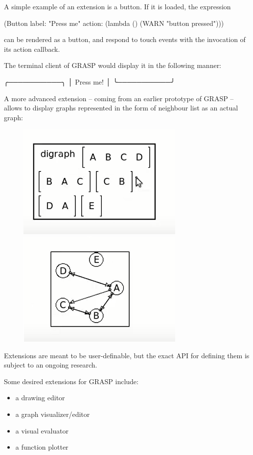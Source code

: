 \documentclass[sigconf]{acmart}
\newenvironment{Snippet}{\Verbatim[samepage=true]}{\endVerbatim}
\begin{document}
A simple example of an extension is a button.
If it is loaded, the expression

\begin{Snippet}
(Button label: "Press me" 
	action: (lambda () (WARN "button pressed")))
\end{Snippet}

can be rendered as a button, and respond
to touch events with the invocation of its
action callback.

The terminal client of GRASP would display
it in the following manner:

\begin{Snippet}
╭───────────╮
│ Press me! │
╰───────────╯
\end{Snippet}

A more advanced extension -- coming from an earlier
prototype of GRASP -- allows to display graphs represented
in the form of neighbour list as an actual graph:

\begin{figure}[H]
  \centering%
  \includegraphics[width=.45\linewidth,frame]{digraph-1}\hfill%
  \includegraphics[width=.45\linewidth,frame]{digraph-2}\hfill%
\end{figure}

Extensions are meant to be user-definable, but
the exact API for defining them is subject to
an ongoing research.

Some desired extensions for GRASP include:
\begin{itemize}
\item a drawing editor
\item a graph visualizer/editor
\item a visual evaluator
\item a function plotter
\end{itemize}
\end{document}
